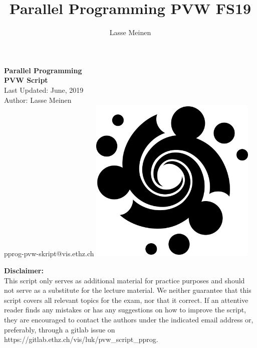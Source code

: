 \documentclass[titlepage, dvipsnames]{article}
\title{Parallel Programming PVW FS19}
\author{Lasse Meinen}
\theoremstyle{plain}
\theoremstyle{remark}
\theoremstyle{definition}
\begin{document}
    \renewcommand{\figurename}{Fig.}
    \renewcommand{\contentsname}{Table of Contents}
    \renewcommand{\thesubfigure}{\roman{subfigure}}
    
    \renewcommand{\ExerciseHeaderTitle}{\ExerciseTitle}
    \renewcommand{\ExerciseHeader}{\centerline{\textbf{\large\ExerciseName\ExerciseHeaderNB\ExerciseHeaderTitle\ExerciseHeaderOrigin}}\\}
    \renewcommand{\ExerciseListHeader}{\ExerciseHeaderDifficulty%
    \textbf{\ExerciseHeaderNB .%
    \ \ExerciseHeaderTitle \newline}%
    \ExerciseHeaderOrigin\ignorespaces}
    \renewcommand{\AnswerListHeader}{\textbf{\ExerciseHeaderNB. \ \ExerciseHeaderTitle}}
    \setlength{\Exesep}{1\baselineskip}    
    \setlength{\QuestionBefore}{.2em}
    \setlength{\QuestionIndent}{2em}
    
    \makeatletter 
        \begin{titlepage}
		\begin{center}
		\huge \textbf{Parallel Programming \\ PVW Script}
		\\ \bigskip
		\Large Last Updated: June, 2019
		\\ \bigskip
		\large Author: Lasse Meinen
		\\ \bigskip
		\Large pprog-pvw-skript@vis.ethz.ch
		\vfill
		{\includegraphics[width = 0.6\textwidth]{images/spirale_black1000x1000.png}}
		\vfill
		\end{center}

		\noindent \textbf{Disclaimer:}\\
		This  script only serves as additional material for practice purposes and should not serve as a substitute for the lecture material. We neither guarantee that this script covers all relevant topics for the exam, nor that it correct. If an attentive reader finds any mistakes or has any suggestions on how to improve the script, they are encouraged to contact the authors under the
		indicated email address or, preferably, through a gitlab issue on https://gitlab.ethz.ch/vis/luk/pvw\_script\_pprog.
	\end{titlepage}
    \makeatother
    \thispagestyle{empty}
    \newpage

    \setcounter{page}{1} %
    
    \tableofcontents
    \newpage
    
    \newpage
    
    \newpage
    
    \newpage
    
    \newpage
\end{document}
